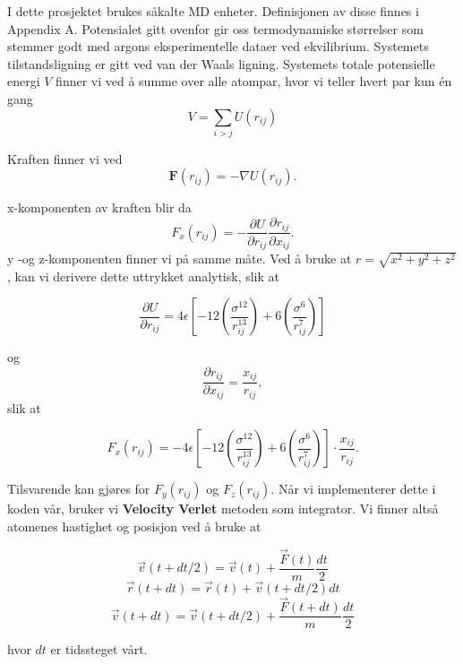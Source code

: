 \documentclass[paper=a4, fontsize=11pt]{scrartcl} %
\numberwithin{equation}{section} %
\numberwithin{figure}{section} %
\numberwithin{table}{section} %
\begin{document}
I dette prosjektet brukes såkalte MD enheter. Definisjonen av disse finnes i Appendix A. Potensialet gitt ovenfor gir oss termodynamiske størrelser som stemmer godt med argons eksperimentelle dataer ved ekvilibrium. Systemets tilstandsligning er gitt ved van der Waals ligning. Systemets totale potensielle energi $V$ finner vi ved å summe over alle atompar, hvor vi teller hvert par kun én gang
\begin{equation}
V = \sum_{i>j} U(r_{ij})
\end{equation}

Kraften finner vi ved
\begin{equation}
\textbf{F}(r_{ij}) = - \nabla U(r_{ij}).
\end{equation}

x-komponenten av kraften blir da
\begin{equation}
F_x (r_{ij}) = -\frac{\partial U}{\partial r_{ij}} \frac{\partial r_{ij}}{\partial x_{ij}}.
\end{equation}
y -og z-komponenten finner vi på samme måte. Ved å bruke at $r = \sqrt{x^2 + y^2 + z^2}$, kan vi  derivere dette uttrykket analytisk, slik at 

\begin{equation}
\frac{\partial U}{\partial r_{ij}} = 4 \epsilon \left[ -12 \left( \frac{\sigma^{12}}{r_{ij}^{13}} \right) + 6 \left( \frac{\sigma^6}{r_{ij}^7} \right) \right]
\end{equation}

og 
\begin{equation}
\frac{\partial r_{ij}}{\partial x_{ij}} = \frac{x_{ij}}{r_{ij}},
\end{equation}
slik at 

\begin{equation}
F_x (r_{ij}) = - 4 \epsilon \left[ -12 \left( \frac{\sigma^{12}}{r_{ij}^{13}} \right) + 6 \left( \frac{\sigma^6}{r_{ij}^7} \right) \right] \cdot \frac{x_{ij}}{r_{ij}}.
\end{equation}

Tilsvarende kan gjøres for $F_y(r_{ij})$ og $F_z(r_{ij})$. Når vi implementerer dette i koden vår, bruker vi \textbf{Velocity Verlet} metoden som integrator. Vi finner altså atomenes hastighet og posisjon ved å bruke at 

\[ \vec{v}(t + dt/2) = \vec{v}(t) + \frac{\vec{F}(t)}{m}\frac{dt}{2} \]
\[\vec{r}(t + dt) = \vec{r}(t) + \vec{v}(t + dt/2)dt \]
\[\vec{v}(t + dt) = \vec{v}(t + dt/2) + \frac{\vec{F}(t + dt)}{m} \frac{dt}{2} \]

hvor $dt$ er tidssteget vårt.
\end{document}

